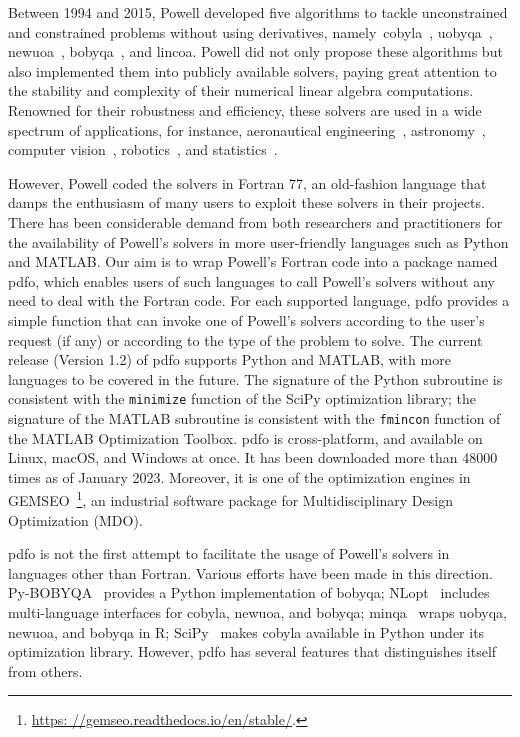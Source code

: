 \documentclass[
    smallextended,  %
    final,        %
]{svjour3}
\begin{document}
Between 1994 and 2015, Powell developed five algorithms to tackle unconstrained and constrained problems without using derivatives, namely~\gls{cobyla}~\cite{Powell_1994}, \gls{uobyqa}~\cite{Powell_2002}, \gls{newuoa}~\cite{Powell_2006}, \gls{bobyqa}~\cite{Powell_2009}, and \gls{lincoa}.
Powell did not only propose these algorithms but also implemented them into publicly available solvers, paying great attention to the stability and complexity of their numerical linear algebra computations.
Renowned for their robustness and efficiency, these solvers are used in a wide spectrum of applications, for instance, aeronautical engineering~\cite{Gallard_Etal_2018}, astronomy~\cite{Biviano_Etal_2013,Mamon_Biviano_Boue_2013}, computer vision~\cite{Izadinia_Shan_Seitz_2017}, robotics~\cite{Mombaur_Truong_Laumond_2010}, and statistics~\cite{Bates_Etal_2015}.

However, Powell coded the solvers in Fortran 77, an old-fashion language that damps the enthusiasm of many users to exploit these solvers in their projects.
There has been considerable demand from both researchers and practitioners for the availability of Powell's solvers in more user-friendly languages such as Python and MATLAB.
Our aim is to wrap Powell's Fortran code into a package named \gls{pdfo}, which enables users of such languages to call Powell's solvers without any need to deal with the Fortran code.
For each supported language, \gls{pdfo} provides a simple function that can invoke one of Powell's solvers according to the user's request (if any) or according to the type of the problem to solve.
The current release (Version 1.2) of \gls{pdfo} supports Python and MATLAB, with more languages to be covered in the future.
The signature of the Python subroutine is consistent with the \texttt{minimize} function of the SciPy optimization library; the signature of the MATLAB subroutine is consistent with the \texttt{fmincon} function of the MATLAB Optimization Toolbox.
\gls{pdfo} is cross-platform, and available on Linux, macOS, and Windows at once.
It has been downloaded more than \num{48000} times as of January 2023.
Moreover, it is one of the optimization engines in GEMSEO~\cite{Gallard_Etal_2018}\footnote{\url{https: //gemseo.readthedocs.io/en/stable/}.}, an industrial software package for Multidisciplinary Design Optimization (MDO).

\Gls{pdfo} is not the first attempt to facilitate the usage of Powell's solvers in languages other than Fortran.
Various efforts have been made in this direction.
Py-BOBYQA~\cite{Cartis_Etal_2019,Cartis_Roberts_Sheridan-Methven_2022} provides a Python implementation of \gls{bobyqa}; NLopt~\cite{Johnson_2019} includes multi-language interfaces for \gls{cobyla}, \gls{newuoa}, and \gls{bobyqa}; minqa~\cite{Bates_Etal_2014} wraps \gls{uobyqa}, \gls{newuoa}, and \gls{bobyqa} in R; SciPy~\cite{Virtanen_Etal_2020} makes \gls{cobyla} available in Python under its optimization library.
However, \gls{pdfo} has several features that distinguishes itself from others.
\end{document}
